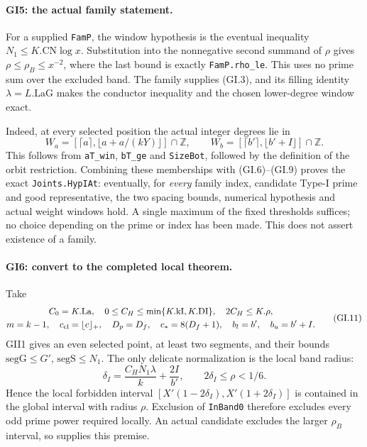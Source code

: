 \paragraph{GI5: the actual family statement.}
For a supplied \texttt{FamP}, the window hypothesis is the
eventual inequality $N_1\le K.\mathrm{CN}\log x$.
Substitution into the nonnegative second summand of $\rho$ gives
$\rho\le\rho_B\le x^{-2}$, where the last bound is exactly
\texttt{FamP.rho\_le}. This uses no prime sum over the excluded
band. The family supplies (GI.3), and its filling identity
$\lambda=L.\mathrm{LaG}$ makes the conductor inequality and
the chosen lower-degree window exact.

Indeed, at every selected position the actual integer degrees
lie in
\[
 W_a=[\lceil a\rceil,\lfloor a+a/(kY)\rfloor]\cap\mathbb Z,
 \qquad
 W_b=[\lceil b'\rceil,\lfloor b'+I\rfloor]\cap\mathbb Z.  \tag{GI.10}
\]
This follows from \texttt{aT\_win}, \texttt{bT\_ge} and
\texttt{SizeBot}, followed by the definition of the orbit
restriction. Combining these memberships with (GI.6)--(GI.9)
proves the exact \texttt{Joints.HypIAt}: eventually, for
\emph{every} family index, candidate Type-I prime and good
representative, the two spacing bounds, numerical hypothesis
and actual weight windows hold. A single maximum of the fixed
thresholds suffices; no choice depending on the prime or index
has been made. This does not assert existence of a family.

\paragraph{GI6: convert to the completed local theorem.}
Take
\[
\begin{gathered}
 C_0=K.\mathrm{La},\quad
 0\le C_H\le\min\{K.\mathrm{kI},K.\mathrm{DI}\},\quad
 2C_H\le K.\rho,\\
 m=k-1,\quad c_{\rm cl}=\lfloor c\rfloor_+,\quad
 D_p=D_f,\quad c_*=8(D_f+1),\quad
 b_l=b',\quad b_u=b'+I.
\end{gathered}                                                    \tag{GI.11}
\]
GII1 gives an even selected point, at least two segments, and
their bounds $\mathrm{segG}\le G'$, $\mathrm{segS}\le N_1$.
The only delicate normalization is the local band radius:
\[
 \delta_I=\frac{C_HN_1\lambda}k+\frac{2I}{b'},\qquad
 2\delta_I\le\rho<1/6.                                  \tag{GI.12}
\]
Hence the local forbidden interval
$[X'(1-2\delta_I),X'(1+2\delta_I)]$ is contained in the
global interval with radius $\rho$. Exclusion of
\texttt{InBand0} therefore excludes every odd prime power
required locally. An actual candidate excludes the larger
$\rho_B$ interval, so supplies this premise.

